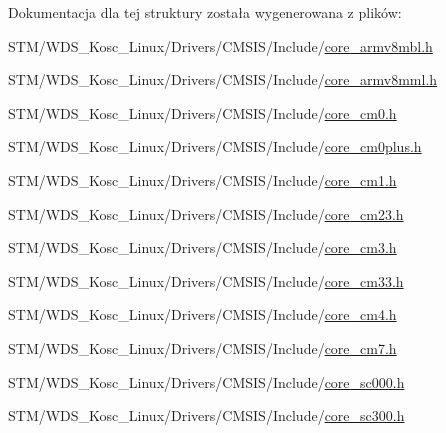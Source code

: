 Dokumentacja dla tej struktury została wygenerowana z plików\+:\begin{DoxyCompactItemize}
\item 
S\+T\+M/\+W\+D\+S\+\_\+\+Kosc\+\_\+\+Linux/\+Drivers/\+C\+M\+S\+I\+S/\+Include/\hyperlink{core__armv8mbl_8h}{core\+\_\+armv8mbl.\+h}\item 
S\+T\+M/\+W\+D\+S\+\_\+\+Kosc\+\_\+\+Linux/\+Drivers/\+C\+M\+S\+I\+S/\+Include/\hyperlink{core__armv8mml_8h}{core\+\_\+armv8mml.\+h}\item 
S\+T\+M/\+W\+D\+S\+\_\+\+Kosc\+\_\+\+Linux/\+Drivers/\+C\+M\+S\+I\+S/\+Include/\hyperlink{core__cm0_8h}{core\+\_\+cm0.\+h}\item 
S\+T\+M/\+W\+D\+S\+\_\+\+Kosc\+\_\+\+Linux/\+Drivers/\+C\+M\+S\+I\+S/\+Include/\hyperlink{core__cm0plus_8h}{core\+\_\+cm0plus.\+h}\item 
S\+T\+M/\+W\+D\+S\+\_\+\+Kosc\+\_\+\+Linux/\+Drivers/\+C\+M\+S\+I\+S/\+Include/\hyperlink{core__cm1_8h}{core\+\_\+cm1.\+h}\item 
S\+T\+M/\+W\+D\+S\+\_\+\+Kosc\+\_\+\+Linux/\+Drivers/\+C\+M\+S\+I\+S/\+Include/\hyperlink{core__cm23_8h}{core\+\_\+cm23.\+h}\item 
S\+T\+M/\+W\+D\+S\+\_\+\+Kosc\+\_\+\+Linux/\+Drivers/\+C\+M\+S\+I\+S/\+Include/\hyperlink{core__cm3_8h}{core\+\_\+cm3.\+h}\item 
S\+T\+M/\+W\+D\+S\+\_\+\+Kosc\+\_\+\+Linux/\+Drivers/\+C\+M\+S\+I\+S/\+Include/\hyperlink{core__cm33_8h}{core\+\_\+cm33.\+h}\item 
S\+T\+M/\+W\+D\+S\+\_\+\+Kosc\+\_\+\+Linux/\+Drivers/\+C\+M\+S\+I\+S/\+Include/\hyperlink{core__cm4_8h}{core\+\_\+cm4.\+h}\item 
S\+T\+M/\+W\+D\+S\+\_\+\+Kosc\+\_\+\+Linux/\+Drivers/\+C\+M\+S\+I\+S/\+Include/\hyperlink{core__cm7_8h}{core\+\_\+cm7.\+h}\item 
S\+T\+M/\+W\+D\+S\+\_\+\+Kosc\+\_\+\+Linux/\+Drivers/\+C\+M\+S\+I\+S/\+Include/\hyperlink{core__sc000_8h}{core\+\_\+sc000.\+h}\item 
S\+T\+M/\+W\+D\+S\+\_\+\+Kosc\+\_\+\+Linux/\+Drivers/\+C\+M\+S\+I\+S/\+Include/\hyperlink{core__sc300_8h}{core\+\_\+sc300.\+h}\end{DoxyCompactItemize}
